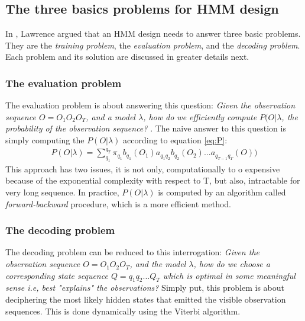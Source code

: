 \subsection{The three basics problems for HMM design}
In \cite{tuto1989}, Lawrence argued that an HMM design needs to answer three basic problems. They are the \textit{training problem}, the \textit{evaluation problem}, and the \textit{decoding problem}. Each problem and its solution are discussed in greater details next. 

\subsubsection{The evaluation problem}
The evaluation problem is about answering this question:
\textit{Given the observation sequence \(O = O_1O_2O_T\), and a model \(\lambda\), how do we efficiently compute \(P(O|\lambda\), the probability of the observation sequence?} \cite{tuto1989} \cite{ches2012} \cite{cont2013}.
The naive answer to this question is simply computing the \(P(O|\lambda)\) according to equation \ref{eq:P}:
\begin{align}
	P(O|\lambda) = \sum_{q_1}^{q_T}\pi_{q_1}b_{q_1}(O_1)a_{q_1q_2}b_{q_2}(O_2)...a_{q_{T-1}q_T}(O)) \label{eq:P}
\end{align}
This approach has two issues, it is not only, computationally to
o expensive because of the exponential complexity with respect to T, but also, intractable for very long sequence. In practice, \(P(O|\lambda)\) is computed by an algorithm called \textit{forward-backward} procedure, which is a more efficient method.

\subsubsection{The decoding problem}
 The decoding problem can be reduced to this interrogation: \textit{Given the observation sequence \(O = O_1O_2O_T\), and the model \(\lambda\), how do we choose a corresponding state sequence \(Q = q_1q_2...Q_T\) which is optimal in some meaningful sense i.e, best "explains" the observations?}
 Simply put, this problem is about deciphering the most likely hidden states that emitted the visible observation sequences.
 This is done dynamically using the Viterbi algorithm. %
 
